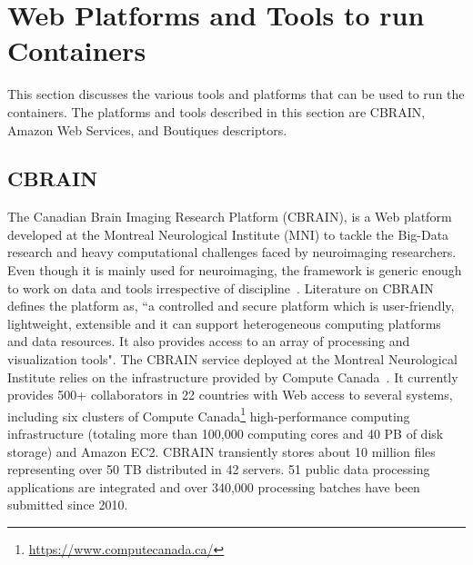 \section{Web Platforms and Tools to run Containers}\label{web_platforms}
This section discusses the various tools and platforms that can be used to run the containers. The platforms and tools described in this section are CBRAIN, Amazon Web Services, and Boutiques descriptors.
\subsection{CBRAIN}
The Canadian Brain Imaging Research Platform (CBRAIN), is a Web 
platform developed at the Montreal Neurological Institute (MNI) to 
tackle the Big-Data research and heavy computational challenges faced 
by neuroimaging researchers. Even though it is mainly used for 
neuroimaging, the framework is generic enough to work on data and 
tools irrespective of discipline~\cite{DBLP:journals/fini/DasGRSPMSRSKMKR17}. Literature on
CBRAIN~\cite{DBLP:journals/fini/DasGRSPMSRSKMKR17} defines the platform 
as, ``a controlled and secure platform which is user-friendly, 
lightweight, extensible and it can support heterogeneous computing 
platforms and data resources. It also provides access to an array of 
processing and visualization tools". The CBRAIN service deployed at the 
Montreal Neurological Institute relies on the infrastructure provided 
by Compute Canada~\cite{DAS20161188}. It currently provides 500+ 
collaborators in 22 countries with Web access to several systems, 
including six clusters of Compute Canada\footnote{\url{https://www.computecanada.ca/}} high-performance
computing infrastructure (totaling more than 100,000 computing cores 
and 40 PB of disk storage) and Amazon EC2. CBRAIN transiently stores 
about 10 million files representing over 50 TB distributed in 42 
servers. 51 public data processing applications are integrated and over 
340,000 processing batches have been submitted since 2010.

